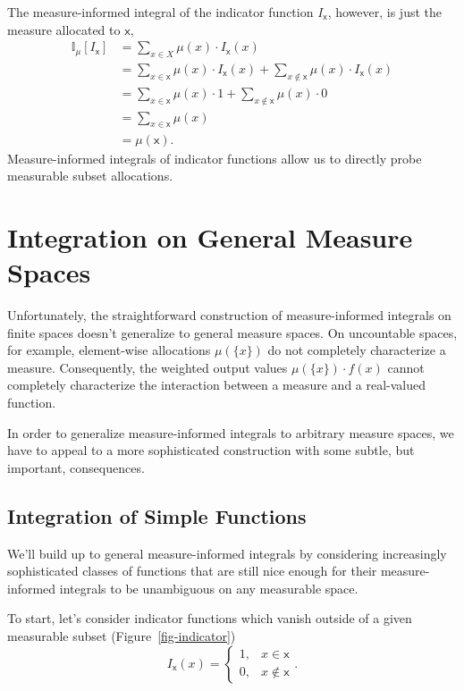 \documentclass[
  letterpaper,
  DIV=11,
  numbers=noendperiod]{scrartcl}
\begin{document}
The measure-informed integral of the indicator function
\(I_{\mathsf{x}}\), however, is just the measure allocated to
\(\mathsf{x}\), \begin{align*}
\mathbb{I}_{\mu}[I_{\mathsf{x}}]
&= \sum_{x \in X} \mu(x) \cdot I_{\mathsf{x}} (x)
\\
&= \sum_{x \in \mathsf{x}} \mu(x) \cdot I_{\mathsf{x}} (x)
  + \sum_{x \notin \mathsf{x}} \mu(x) \cdot I_{\mathsf{x}} (x)
\\
&=  \sum_{x \in \mathsf{x}} \mu(x) \cdot 1
  + \sum_{x \notin \mathsf{x}} \mu(x) \cdot 0
\\
&=  \sum_{x \in \mathsf{x}} \mu(x)
\\
&= \mu( \mathsf{x} ).
\end{align*} Measure-informed integrals of indicator functions allow us
to directly probe measurable subset allocations.

\section{Integration on General Measure Spaces}\label{sec:gen_int}

Unfortunately, the straightforward construction of measure-informed
integrals on finite spaces doesn't generalize to general measure spaces.
On uncountable spaces, for example, element-wise allocations
\(\mu( \{x\} )\) do not completely characterize a measure. Consequently,
the weighted output values \(\mu( \{ x \} ) \cdot f(x)\) cannot
completely characterize the interaction between a measure and a
real-valued function.

In order to generalize measure-informed integrals to arbitrary measure
spaces, we have to appeal to a more sophisticated construction with some
subtle, but important, consequences.

\subsection{Integration of Simple
Functions}\label{integration-of-simple-functions}

We'll build up to general measure-informed integrals by considering
increasingly sophisticated classes of functions that are still nice
enough for their measure-informed integrals to be unambiguous on any
measurable space.

To start, let's consider indicator functions which vanish outside of a
given measurable subset (Figure~\ref{fig-indicator}) \[
I_{\mathsf{x}} (x) =
\left\{
\begin{array}{rr}
1, & x \in \mathsf{x} \\
0, & x \notin \mathsf{x}
\end{array}
\right. .
\]
\end{document}
